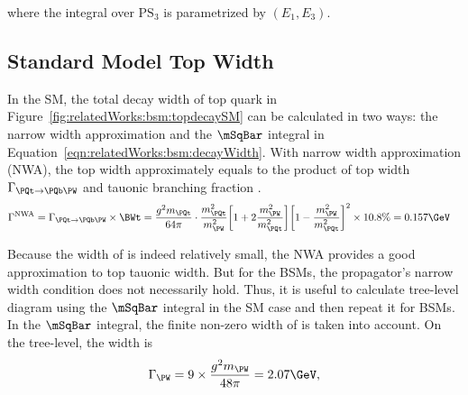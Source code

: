 \noindent where the integral over $\mathrm{PS_3}$ is parametrized by $ ( E_1,E_3 )$.



\subsection{Standard Model Top Width}
\label{sec:relatedWorks:bsm:smTopDecay}

In the SM, the total decay width of top quark in Figure~\ref{fig:relatedWorks:bsm:topdecaySM} can be calculated in two ways: the narrow width approximation and the $\mSqBar $ integral in Equation~\ref{eqn:relatedWorks:bsm:decayWidth}. With narrow width approximation (NWA), the top width approximately equals to the product of top width $\Gamma_{\PQt \to \PQb \PW}$ and \PW tauonic branching fraction \BWt.
\begin{equation}
\begin{split}
    \Gamma^{\rm NWA} &= \Gamma_{\PQt \to \PQb \PW} \times \BWt = \frac{g^2 m_\PQt }{64\pi} \cdot \frac{m_\PQt^2}{m_\PW^2} \bigg[ 1+2 \frac{m_\PW^2}{m_\PQt^2}\bigg] \bigg[1-\frac{m_\PW^2}{m_\PQt^2} \bigg]^2 \times 10.8\%  = 0.157 \GeV
\end{split}
\label{eqn:relatedWorks:bsm:nwa}
\end{equation}

\noindent Because the width of \PW is indeed relatively small, the NWA provides a good approximation to top tauonic width. But for the BSMs, the propagator's narrow width condition does not necessarily hold. Thus, it is useful to calculate tree-level diagram using the $\mSqBar $ integral in the SM case and then repeat it for BSMs. In the $\mSqBar $ integral, the finite non-zero width of \PW is taken into account. On the tree-level, the \PW width is
\begin{equation}
	\Gamma_{\PW} = 9 \times \frac{g^2 m_\PW}{48 \pi} = 2.07 \GeV,
    \label{eqn:relatedWorks:bsm:wWidth}
\end{equation}


